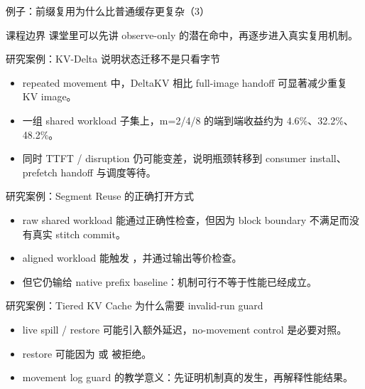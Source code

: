 \begin{frame}{例子：前缀复用为什么比普通缓存更复杂（3）}
\begin{block}{课程边界}
    课堂里可以先讲 observe-only 的潜在命中，再逐步进入真实复用机制。
  \end{block}
\end{frame}

\begin{frame}{研究案例：KV-Delta 说明状态迁移不是只看字节}
  \begin{itemize}
    \item repeated movement 中，DeltaKV 相比 full-image handoff 可显著减少重复 KV image。
    \item 一组 shared workload 子集上，m=2/4/8 的端到端收益约为 4.6\%、32.2\%、48.2\%。
    \item 同时 TTFT / disruption 仍可能变差，说明瓶颈转移到 consumer install、prefetch handoff 与调度等待。
  \end{itemize}
\end{frame}

\begin{frame}{研究案例：Segment Reuse 的正确打开方式}
  \begin{itemize}
    \item raw shared workload 能通过正确性检查，但因为 block boundary 不满足而没有真实 stitch commit。
    \item aligned workload 能触发 \texttt{}，并通过输出等价检查。
    \item 但它仍输给 native prefix baseline：机制可行不等于性能已经成立。
  \end{itemize}
\end{frame}

\begin{frame}{研究案例：Tiered KV Cache 为什么需要 invalid-run guard}
  \begin{itemize}
    \item live spill / restore 可能引入额外延迟，no-movement control 是必要对照。
    \item restore 可能因为 \texttt{} 或 \texttt{} 被拒绝。
    \item movement log guard 的教学意义：先证明机制真的发生，再解释性能结果。
  \end{itemize}
\end{frame}

